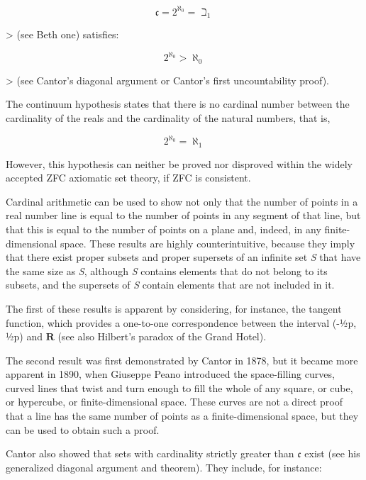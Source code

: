 $$\mathfrak{c} = 2^{\aleph _0} = \beth _1$$

> (see Beth one) satisfies:



$$2^{\aleph _0} > \aleph _0$$



> (see Cantor's diagonal argument or Cantor's first uncountability proof).



The continuum hypothesis states that there is no cardinal number between the cardinality
of the reals and the cardinality of the natural numbers, that is,



$$2^{\aleph _0} = \aleph _1$$



However, this hypothesis can neither be proved nor disproved within the widely accepted
ZFC axiomatic set theory, if ZFC is consistent.



Cardinal arithmetic can be used to show not only that the number of points in a real
number line is equal to the number of points in any segment of that line, but that this is
equal to the number of points on a plane and, indeed, in any finite-dimensional space.
These results are highly counterintuitive, because they imply that there exist proper
subsets and proper supersets of an infinite set \textit{S} that have the same size as
\textit{S}, although \textit{S} contains elements that do not belong to its subsets, and
the supersets of \textit{S} contain elements that are not included in it.



The first of these results is apparent by considering, for instance, the tangent function,
which provides a one-to-one correspondence between the interval (-½p, ½p) and $\mathbf{R}$
(see also Hilbert's paradox of the Grand Hotel).



The second result was first demonstrated by Cantor in 1878, but it became more apparent in
1890, when Giuseppe Peano introduced the space-filling curves, curved lines that twist and
turn enough to fill the whole of any square, or cube, or hypercube, or finite-dimensional
space. These curves are not a direct proof that a line has the same number of points as a
finite-dimensional space, but they can be used to obtain such a proof.



Cantor also showed that sets with cardinality strictly greater than $\mathfrak c$ exist
(see his generalized diagonal argument and theorem). They include, for instance:



